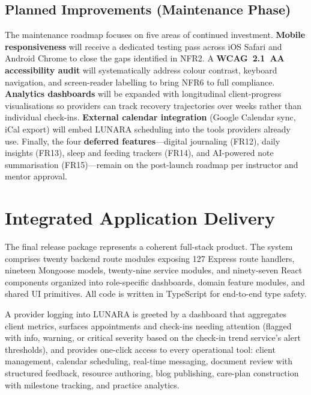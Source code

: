 \documentclass[12pt,letterpaper]{article}
\begin{document}
\subsection{Planned Improvements (Maintenance Phase)}

The maintenance roadmap focuses on five areas of continued investment. \textbf{Mobile responsiveness} will receive a dedicated testing pass across iOS Safari and Android Chrome to close the gaps identified in NFR2. A \textbf{WCAG~2.1~AA accessibility audit} will systematically address colour contrast, keyboard navigation, and screen-reader labelling to bring NFR6 to full compliance. \textbf{Analytics dashboards} will be expanded with longitudinal client-progress visualisations so providers can track recovery trajectories over weeks rather than individual check-ins. \textbf{External calendar integration} (Google Calendar sync, iCal export) will embed LUNARA scheduling into the tools providers already use. Finally, the four \textbf{deferred features}---digital journaling (FR12), daily insights (FR13), sleep and feeding trackers (FR14), and AI-powered note summarisation (FR15)---remain on the post-launch roadmap per instructor and mentor approval.

\newpage

\section{Integrated Application Delivery}

The final release package represents a coherent full-stack product. The system comprises twenty backend route modules exposing 127 Express route handlers, nineteen Mongoose models, twenty-nine service modules, and ninety-seven React components organized into role-specific dashboards, domain feature modules, and shared UI primitives. All code is written in TypeScript for end-to-end type safety.

A provider logging into LUNARA is greeted by a dashboard that aggregates client metrics, surfaces appointments and check-ins needing attention (flagged with info, warning, or critical severity based on the check-in trend service's alert thresholds), and provides one-click access to every operational tool: client management, calendar scheduling, real-time messaging, document review with structured feedback, resource authoring, blog publishing, care-plan construction with milestone tracking, and practice analytics.
\end{document}
